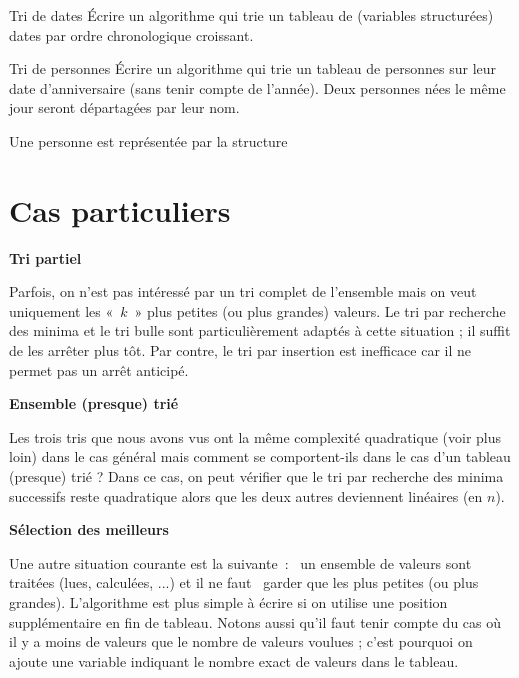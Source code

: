	\begin{Exercice}{Tri de dates}
			Écrire un algorithme qui trie un tableau de (variables structurées)
			dates par ordre chronologique croissant.
	\end{Exercice}
	
	\begin{Exercice}{Tri de personnes}
			Écrire un algorithme qui trie un tableau de personnes sur leur date
			d'anniversaire (sans tenir compte de
			l'année). Deux personnes nées le même jour seront
			départagées par leur nom.

			Une personne est représentée par la structure 
			
			\bigskip
			
			
	\end{Exercice}


\section{Cas particuliers}

	{\sffamily\bfseries\upshape
	Tri partiel}

		Parfois, on n’est pas intéressé par un tri complet de l’ensemble mais on
		veut uniquement les «~$k$~» plus petites (ou plus grandes) valeurs. Le
		tri par recherche des minima et le tri bulle sont particulièrement
		adaptés à cette situation ; il suffit de les arrêter plus tôt. Par
		contre, le tri par insertion est inefficace car il ne permet pas un
		arrêt anticipé.

	{\sffamily\bfseries\upshape
	Ensemble (presque) trié}

		Les trois tris que nous avons vus ont la même complexité quadratique
		(voir plus loin) dans le cas général mais comment se comportent-ils
		dans le cas d’un tableau (presque) trié ? Dans ce cas, on peut vérifier
		que le tri par recherche des minima successifs reste quadratique alors
		que les deux autres deviennent linéaires (en $n$).

	{\sffamily\bfseries\upshape
	Sélection des meilleurs}

		Une autre situation courante est la suivante~: \ un ensemble de valeurs
		sont traitées (lues, calculées, ...) et il ne faut \ garder que les
		 plus petites (ou plus grandes).
		L'algorithme est plus simple à écrire si on utilise
		une position supplémentaire en fin de tableau. Notons aussi qu’il faut
		tenir compte du cas où il y a moins de valeurs que le nombre de valeurs
		voulues ; c’est pourquoi on ajoute une variable indiquant le nombre
		exact de valeurs dans le tableau.

